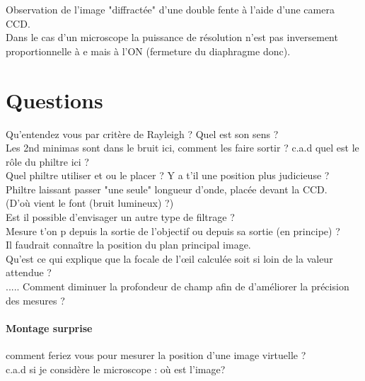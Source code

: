\documentclass[12pt,prb,aps,epsf]{report}
\begin{document}
Observation de l'image "diffractée" d'une double fente à l'aide d'une camera CCD.\\
Dans le cas d'un microscope la puissance de résolution n'est pas inversement proportionnelle à e mais à l'ON (fermeture du diaphragme donc).

\section{Questions}
Qu'entendez vous par critère de Rayleigh ? Quel est son sens ?\\

Les 2nd minimas sont dans le bruit ici, comment les faire sortir ? c.a.d quel est le rôle du philtre ici ?\\

Quel philtre utiliser et ou le placer ? Y a t'il une position plus judicieuse ?\\
Philtre laissant passer "une seule" longueur d'onde, placée devant la CCD.\\

(D'où vient le font (bruit lumineux) ?)\\

Est il possible d'envisager un autre type de filtrage ?\\

Mesure t'on p depuis la sortie de l'objectif ou depuis sa sortie (en principe) ?\\
Il faudrait connaître la position du plan principal image.\\

Qu'est ce qui explique que la focale de l'œil calculée soit si loin de la valeur attendue ?\\

..... Comment diminuer la profondeur de champ afin de d'améliorer la précision des mesures ?\\

\paragraph{Montage surprise} comment feriez vous pour mesurer la position d'une image virtuelle ?\\ c.a.d si je considère le microscope : où est l'image?
\end{document}
